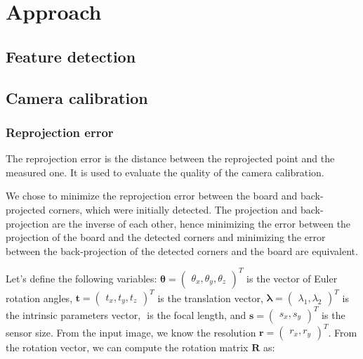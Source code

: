 \chapter{Approach}\label{cha:approach}

\section{Feature detection}\label{sec:feature_detection}

\section{Camera calibration}\label{sec:camera_calibration}

\subsection{Reprojection error}\label{sub:reprojection_error}

The reprojection error is the distance between the reprojected point and the
measured one. It is used to evaluate the quality of the camera calibration.

We chose to minimize the reprojection error between the board and back-projected
corners, which were initially detected. The projection and back-projection are
the inverse of each other, hence minimizing the error between the projection of
the board and the detected corners and minimizing the error between the
back-projection of the detected corners and the board are
equivalent.

Let's define the following variables: \(\boldsymbol{\theta} = \begin{pmatrix}
	\theta_x, \theta_y, \theta_z
\end{pmatrix}^{T}\) is the vector of Euler rotation angles, \(\mathbf{t} = \begin{pmatrix}
	t_x, t_y, t_z
\end{pmatrix}^{T}\) is the translation vector, \(\boldsymbol{\lambda} = \begin{pmatrix}
	\lambda_1, \lambda_2
\end{pmatrix}^{T}\) is the intrinsic parameters vector, \(\) is the focal
length, and \(\mathbf{s} = \begin{pmatrix}
	s_x, s_y
\end{pmatrix}^{T}\) is the sensor size.
From the input image, we know the resolution \(\mathbf{r} = \begin{pmatrix}
	r_x, r_y
\end{pmatrix}^{T}\).
From the rotation vector, we can compute the rotation matrix \(\mathbf{R}\) as:

